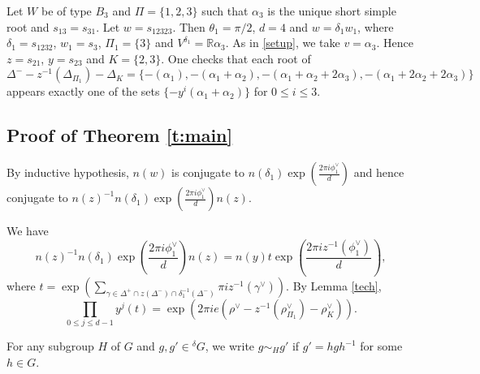 \documentclass[12pt,leqno]{article}
\newtheorem{proposition}[equation]{Proposition}
\newcommand{\qed}{\hfill $\square$ \medskip}
\newenvironment{proof}[1][Proof]{\noindent\textbf{#1.} }{\qed}
\renewcommand{\a}{\mathfrak a}
\newcommand{\g}{\mathfrak g}
\def\le{\leqslant}
\def\a{\alpha}
\def\g{\gamma}
\def\d{\delta}
\def\D{\Delta}
\def\th{\theta}
\def\l{\lambda}
\def\i{^{-1}}
\begin{document}
\begin{exampleplain}
	Let $W$ be of type $B_3$ and $\Pi=\{1, 2, 3\}$ such that $\a_3$ is the unique short simple root and $s_{13} = s_{31}$. Let $w=s_{12323}$. Then $\th_1 = \pi/2$, $d = 4$ and $w = \d_1 w_1$, where $\d_1 = s_{1232}$, $w_1 = s_3$, $\Pi_1=\{3\}$ and $V^{\d_1} = \mathbb R \a_3$. As in \ref{setup}, we take $v = \a_3$. Hence $z = s_{21}$, $y = s_{23}$ and $K=\{2, 3\}$. One checks that each root of $\D^- - z\i(\D_{\Pi_1}) - \D_K=\{-(\a_1), -(\a_1+\a_2), -(\a_1+\a_2+2 \a_3), -(\a_1+2 \a_2+2 \a_3)\}$ appears exactly one of the sets $\{-y^i(\a_1+\a_2)\}$ for $0 \le i \le 3$.
\end{exampleplain}

\subsection{Proof of Theorem \ref{t:main}}
\begin{comment}
\begin{proposition} \label{formula}
Let $e = d\th_1/2\pi$. Then $$n(w) \sim \d \exp(2\pi i\frac{e\rho^\vee + \overline{\l_1^\vee}}{d}).$$
\end{proposition}
Notice that $e\rho^\vee + \overline{\l_1^\vee}$ is dominant and is fixed by $\d$.

\begin{proof}
	Let $\mathcal B =z^{-1}((\D^+ \cap z(\D^-)) - \mathcal F(x z, z^{-1}))$ and $t=\exp (\pi i \sum_{\g \in \mathcal B} \g^\vee)$. Thanks to Lemma \ref{tech} below and that $y$ is elliptic for $\D_K$ we have $$\prod_{0 \le j \le d-1} y^j(t)=\exp(2\pi i e (\rho^\vee-z^{-1}(\rho_J^\vee)-\rho_K^\vee)).$$
\end{comment}
By inductive hypothesis, $n(w)$ is conjugate to $n(\d_1) \exp(\frac{2 \pi i \phi_1^\vee}{d})$ and hence conjugate to $n(z)^{-1} n(\d_1) \exp(\frac{2 \pi i \phi_1^\vee}{d}) n(z)$.

We have $$n(z)^{-1} n(\d_1) \exp(\frac{2 \pi i \phi_1^\vee}{d}) n(z)=n(y) t \exp(\frac{2 \pi i z^{-1}(\phi_1^\vee)}{d}),$$ where $t=\exp (\sum_{\g \in \D^+ \cap z(\D^-) \cap \d_1 \i(\D^-)} \pi i z^{-1}(\g^\vee))$. By Lemma \ref{tech}, $$\prod_{0 \le j \le d-1} y^j(t)=\exp(2\pi i e (\rho^\vee-z^{-1}(\rho_{\Pi_1}^\vee)-\rho_K^\vee)).$$

For any subgroup $H$ of $G$ and $g, g' \in {}^\d G$, we write $g \sim_H g'$ if $g'=h g h \i$ for some $h \in G$.
\end{document}
